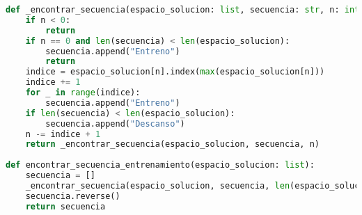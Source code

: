 \begin{lstlisting}[language=Python]
def _encontrar_secuencia(espacio_solucion: list, secuencia: str, n: int):
    if n < 0:
        return
    if n == 0 and len(secuencia) < len(espacio_solucion):
        secuencia.append("Entreno")
        return
    indice = espacio_solucion[n].index(max(espacio_solucion[n]))
    indice += 1
    for _ in range(indice):
        secuencia.append("Entreno")
    if len(secuencia) < len(espacio_solucion):
        secuencia.append("Descanso")
    n -= indice + 1
    return _encontrar_secuencia(espacio_solucion, secuencia, n)
 
def encontrar_secuencia_entrenamiento(espacio_solucion: list):
    secuencia = []
    _encontrar_secuencia(espacio_solucion, secuencia, len(espacio_solucion) - 1)
    secuencia.reverse()
    return secuencia
\end{lstlisting}